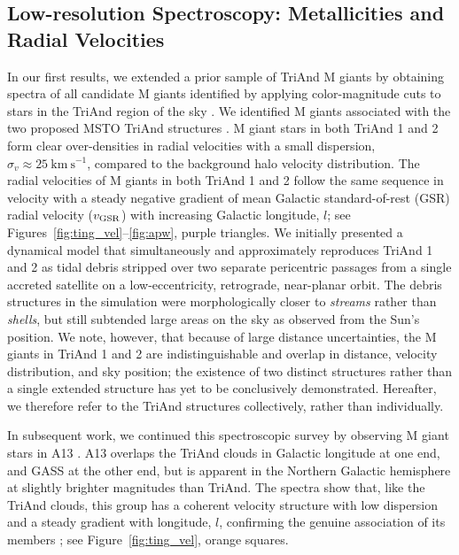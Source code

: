 \documentclass[galaxies,article,submit,moreauthors,pdftex,10pt,a4paper]{mdpi}
\newcommand{\kms}{\mathrm{km}~\mathrm{s}^{-1}}
\begin{document}
\subsection{Low-resolution Spectroscopy: Metallicities and Radial Velocities}

In our first results, we extended a prior sample of TriAnd M giants
\cite{rochapinto04} by obtaining spectra of all candidate M giants identified
by applying color-magnitude cuts to stars in the TriAnd region of the sky
\cite{sheffield14}.
We identified M giants associated with the two proposed MSTO TriAnd structures
\cite[TriAnd 1 and 2, as named by][]{martin07,martin14}.
M giant stars in both TriAnd 1 and 2 form clear over-densities in radial
velocities with a small dispersion, $\sigma_v \approx 25~\kms$, compared to the
background halo velocity distribution.
The radial velocities of M giants in both TriAnd 1 and 2 follow the same
sequence in velocity with a steady negative gradient of mean Galactic
standard-of-rest (GSR) radial velocity ($v_{\rm GSR}$) with increasing Galactic
longitude, $l$; see Figures~\ref{fig:ting_vel}--\ref{fig:apw}, purple triangles.
We initially presented a dynamical model that simultaneously and approximately
reproduces TriAnd 1 and 2 as tidal debris stripped over two separate pericentric
passages from a single accreted satellite on a low-eccentricity, retrograde,
near-planar orbit.
The debris structures in the simulation were morphologically closer to {\it
streams} rather than {\it shells}, but still subtended large areas on the sky
as observed from the Sun's position.
We note, however, that because of large distance uncertainties, the M giants in
TriAnd 1 and 2 are indistinguishable and overlap in distance, velocity
distribution, and sky position; the existence of two distinct structures rather
than a single extended structure has yet to be conclusively demonstrated.
Hereafter, we therefore refer to the TriAnd structures collectively, rather
than individually.

In subsequent work, we continued this spectroscopic survey by observing M giant
stars in A13 \cite{sharma10}.
A13 overlaps the TriAnd clouds in Galactic longitude at one end, and GASS at
the other end, but is apparent in the Northern Galactic hemisphere at slightly
brighter magnitudes than TriAnd.
The spectra show that, like the TriAnd clouds, this group has a
coherent velocity structure with low dispersion and a steady gradient with
longitude, $l$, confirming the genuine association of its members \cite{li17};
see Figure~\ref{fig:ting_vel}, orange squares.
\end{document}
